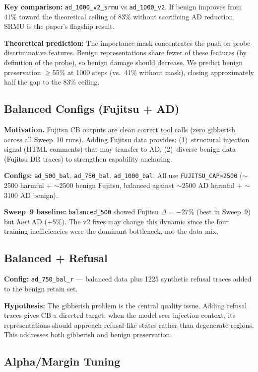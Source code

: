 \documentclass[11pt]{article}
\begin{document}
\textbf{Key comparison:} \texttt{ad\_1000\_v2\_srmu} vs \texttt{ad\_1000\_v2}.
If benign improves from 41\% toward the theoretical ceiling of 83\% without
sacrificing AD reduction, SRMU is the paper's flagship result.

\textbf{Theoretical prediction:} The importance mask concentrates the push on
probe-discriminative features.  Benign representations share fewer of these
features (by definition of the probe), so benign damage should decrease.  We
predict benign preservation $\geq$55\% at 1000 steps (vs.\ 41\% without mask),
closing approximately half the gap to the 83\% ceiling.

\subsection{Balanced Configs (Fujitsu + AD)}

\textbf{Motivation.} Fujitsu CB outputs are clean correct tool calls (zero
gibberish across all Sweep~10 runs).  Adding Fujitsu data provides:
(1)~structural injection signal (HTML comments) that may transfer to AD,
(2)~diverse benign data (Fujitsu DR traces) to strengthen capability anchoring.

\textbf{Configs:} \texttt{ad\_500\_bal}, \texttt{ad\_750\_bal},
\texttt{ad\_1000\_bal}.  All use \texttt{FUJITSU\_CAP=2500} ($\sim$2500
harmful + $\sim$2500 benign Fujitsu, balanced against $\sim$2500 AD harmful
+ $\sim$3100 AD benign).

\textbf{Sweep~9 baseline:} \texttt{balanced\_500} showed Fujitsu $\Delta =
-27\%$ (best in Sweep~9) but \emph{hurt} AD ($+5\%$).  The v2 fixes may
change this dynamic since the four training inefficiencies were the dominant
bottleneck, not the data mix.

\subsection{Balanced + Refusal}

\textbf{Config:} \texttt{ad\_750\_bal\_r} --- balanced data plus 1225 synthetic
refusal traces added to the benign retain set.

\textbf{Hypothesis:} The gibberish problem is the central quality issue.
Adding refusal traces gives CB a directed target: when the model sees injection
context, its representations should approach refusal-like states rather than
degenerate regions.  This addresses both gibberish and benign preservation.

\subsection{Alpha/Margin Tuning}
\end{document}
